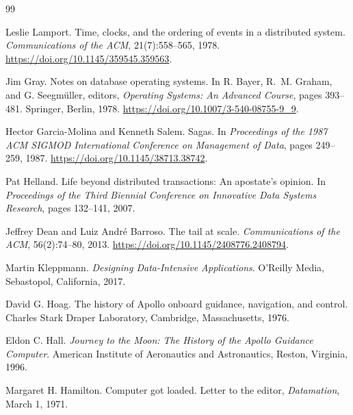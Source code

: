 \documentclass[11pt]{report}
\begin{document}
\begin{thebibliography}{99}

Leslie Lamport.
\newblock Time, clocks, and the ordering of events in a distributed system.
\newblock \emph{Communications of the ACM}, 21(7):558--565, 1978.
\newblock \url{https://doi.org/10.1145/359545.359563}.

Jim Gray.
\newblock Notes on database operating systems.
\newblock In R. Bayer, R.~M. Graham, and G. Seegm\"uller, editors,
\emph{Operating Systems: An Advanced Course}, pages 393--481.
Springer, Berlin, 1978.
\newblock \url{https://doi.org/10.1007/3-540-08755-9_9}.

Hector Garcia-Molina and Kenneth Salem.
\newblock Sagas.
\newblock In \emph{Proceedings of the 1987 ACM SIGMOD International
Conference on Management of Data}, pages 249--259, 1987.
\newblock \url{https://doi.org/10.1145/38713.38742}.

Pat Helland.
\newblock Life beyond distributed transactions: An apostate's opinion.
\newblock In \emph{Proceedings of the Third Biennial Conference on
Innovative Data Systems Research}, pages 132--141, 2007.

Jeffrey Dean and Luiz Andr\'e Barroso.
\newblock The tail at scale.
\newblock \emph{Communications of the ACM}, 56(2):74--80, 2013.
\newblock \url{https://doi.org/10.1145/2408776.2408794}.

Martin Kleppmann.
\newblock \emph{Designing Data-Intensive Applications}.
\newblock O'Reilly Media, Sebastopol, California, 2017.


David G. Hoag.
\newblock The history of Apollo onboard guidance, navigation, and control.
\newblock Charles Stark Draper Laboratory, Cambridge, Massachusetts, 1976.

Eldon C. Hall.
\newblock \emph{Journey to the Moon: The History of the Apollo Guidance
Computer}.
\newblock American Institute of Aeronautics and Astronautics,
Reston, Virginia, 1996.

Margaret H. Hamilton.
\newblock Computer got loaded.
\newblock Letter to the editor, \emph{Datamation}, March 1, 1971.


\end{thebibliography}
\end{document}
